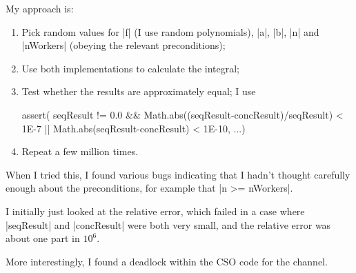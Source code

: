 \begin{slide}

My approach is:
%
\begin{enumerate}
\item Pick random values for |f| (I use random polynomials), |a|, |b|, |n| and
|nWorkers| (obeying the relevant preconditions);

\item Use both implementations to calculate the integral;

\item Test whether the results are approximately equal; I use
\begin{scala}
assert(
  seqResult != 0.0 && Math.abs((seqResult-concResult)/seqResult) < 1E-7 ||
    Math.abs(seqResult-concResult) < 1E-10, ...)
\end{scala}

\item Repeat a few million times.
\end{enumerate}
\end{slide}


\begin{selfnote}
When I tried this, I found various bugs indicating that I hadn't thought
carefully enough about the preconditions, for example that |n >= nWorkers|.

I initially just looked at the relative error, which failed in a case where
|seqResult| and |concResult| were both very small, and the relative error was
about one part in $10^6$.  

More interestingly, I found a deadlock within the CSO code for the channel.
\end{selfnote}

